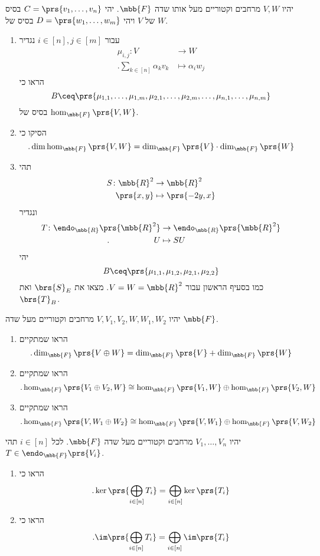 \documentclass[a4paper,10pt,twoside,openany]{article}
\begin{document}
\begin{exercise}
יהיו
$V,W$
מרחבים וקטוריים מעל אותו שדה
$\mbb{F}$.
יהי
$C = \prs{v_1, \ldots, v_n}$
בסיס של
$V$
ויהי
$D = \prs{w_1, \ldots, w_m}$
בסיס של
$W$.

\begin{enumerate}
\item עבור
$i \in [n], j \in [m]$
נגדיר
\begin{align*}
\mu_{i,j} \colon V &\to W \\
\text{.} \sum_{k \in [n]} \alpha_k v_k &\mapsto \alpha_i w_j
\end{align*}
הראו כי
\[B \ceq \prs{\mu_{1,1}, \ldots, \mu_{1,m}, \mu_{2,1}, \ldots, \mu_{2,m}, \ldots, \mu_{n,1}, \ldots, \mu_{n,m}}\]
בסיס של
$\hom_{\mbb{F}}\prs{V,W}$.
\item הסיקו כי
\[\text{.} \dim\hom_{\mbb{F}}\prs{V,W} = \dim_{\mbb{F}}\prs{V} \cdot \dim_{\mbb{F}}\prs{W}\]
\item תהי
\begin{align*}
S \colon \mbb{R}^2 &\to \mbb{R}^2 \\
\prs{x,y} &\mapsto \prs{-2y, x}
\end{align*}
ונגדיר
\begin{align*}
T \colon \endo_{\mbb{R}}\prs{\mbb{R}^2} &\to \endo_{\mbb{R}}\prs{\mbb{R}^2} \\
\text{.} \hphantom{lalalalalalal} U &\mapsto SU
\end{align*}
יהי
\[B \ceq \prs{\mu_{1,1}, \mu_{1,2}, \mu_{2,1}, \mu_{2,2}}\]
כמו בסעיף הראשון עבור
$V=W=\mbb{R}^2$.
מצאו את
$\brs{S}_E$
ואת
$\brs{T}_B$.
\end{enumerate}
\end{exercise}

\begin{exercise}
יהיו
$V,V_1,V_2,W,W_1,W_2$
מרחבים וקטוריים מעל שדה
$\mbb{F}$.
\begin{enumerate}
\item הראו שמתקיים
\[\text{.} \dim_{\mbb{F}}\prs{V \oplus W} = \dim_{\mbb{F}}\prs{V} + \dim_{\mbb{F}}\prs{W}\]
\item הראו שמתקיים
\[\text{.} \hom_{\mbb{F}}\prs{V_1 \oplus V_2, W} \cong \hom_{\mbb{F}}\prs{V_1, W} \oplus \hom_{\mbb{F}}\prs{V_2, W}\]
\item הראו שמתקיים
\[\text{.} \hom_{\mbb{F}}\prs{V, W_1 \oplus W_2} \cong \hom_{\mbb{F}}\prs{V, W_1} \oplus \hom_{\mbb{F}}\prs{V, W_2}\]
\end{enumerate}
\end{exercise}

\begin{exercise}
יהיו
$V_1, \ldots, V_n$
מרחבים וקטוריים מעל שדה
$\mbb{F}$.
לכל
$i \in [n]$
תהי
$T \in \endo_{\mbb{F}}\prs{V_i}$.
\begin{enumerate}
\item הראו כי
\[\text{.} \ker\prs{\bigoplus_{i \in [n]} T_i} = \bigoplus_{i \in [n]} \ker\prs{T_i}\]
\item הראו כי
\[\text{.} \im\prs{\bigoplus_{i \in [n]} T_i} = \bigoplus_{i \in [n]} \im\prs{T_i}\]
\end{enumerate}
\end{exercise}
\end{document}
